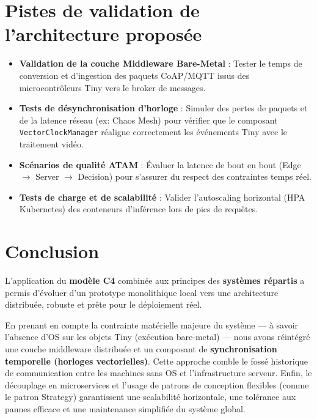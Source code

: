 \documentclass[11pt,a4paper]{article}
\begin{document}
\section{Pistes de validation de l'architecture proposée}

\begin{itemize}
    \item \textbf{Validation de la couche Middleware Bare-Metal} : Tester le temps de conversion et d'ingestion des paquets CoAP/MQTT issus des microcontrôleurs Tiny vers le broker de messages.
    \item \textbf{Tests de désynchronisation d'horloge} : Simuler des pertes de paquets et de la latence réseau (ex: Chaos Mesh) pour vérifier que le composant \texttt{VectorClockManager} réaligne correctement les événements Tiny avec le traitement vidéo.
    \item \textbf{Scénarios de qualité ATAM} : Évaluer la latence de bout en bout (Edge $\rightarrow$ Server $\rightarrow$ Decision) pour s'assurer du respect des contraintes temps réel.
    \item \textbf{Tests de charge et de scalabilité} : Valider l'autoscaling horizontal (HPA Kubernetes) des conteneurs d'inférence lors de pics de requêtes.
\end{itemize}

\section{Conclusion}

L'application du \textbf{modèle C4} combinée aux principes des \textbf{systèmes répartis} a permis d'évoluer d'un prototype monolithique local vers une architecture distribuée, robuste et prête pour le déploiement réel. 

En prenant en compte la contrainte matérielle majeure du système --- à savoir l'absence d'OS sur les objets Tiny (exécution bare-metal) --- nous avons réintégré une couche middleware distribuée et un composant de \textbf{synchronisation temporelle (horloges vectorielles)}. Cette approche comble le fossé historique de communication entre les machines sans OS et l'infrastructure serveur. Enfin, le découplage en microservices et l'usage de patrons de conception flexibles (comme le patron Strategy) garantissent une scalabilité horizontale, une tolérance aux pannes efficace et une maintenance simplifiée du système global.
\end{document}
